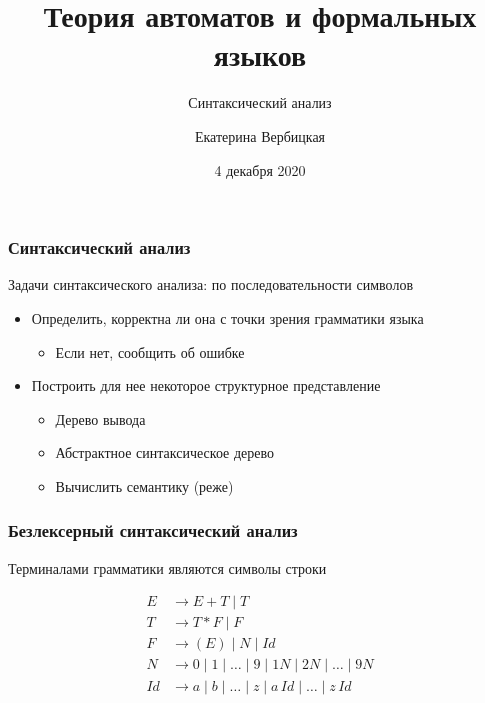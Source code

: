 \documentclass{beamer}
\title[]{Теория автоматов и формальных языков}
\subtitle[]{Синтаксический анализ}
\institute[]{
Санкт-Петербургский государственный электротехнический университет <<ЛЭТИ>>\\
}
\author[]{Екатерина Вербицкая}
\date{4 декабря 2020}
\begin{document}
{
  \begin{frame}
    \titlepage
  \end{frame}
}

\begin{frame}[fragile]
  \frametitle{Синтаксический анализ}
\begin{center}
  Задачи синтаксического анализа: по последовательности символов
\end{center}

  \begin{itemize}
    \item Определить, корректна ли она с точки зрения грамматики языка
    \begin{itemize}
      \item Если нет, сообщить об ошибке
    \end{itemize}
    \item Построить для нее некоторое структурное представление
    \begin{itemize}
      \item Дерево вывода
      \item Абстрактное синтаксическое дерево
      \item Вычислить семантику (реже)
    \end{itemize}
  \end{itemize}
\end{frame}

\begin{frame}[fragile]
  \frametitle{Безлексерный синтаксический анализ}
\begin{center}
  Терминалами грамматики являются символы строки
\end{center}

\begin{align*}
  E &\to E + T \mid T  \\
  T &\to T * F \mid F  \\
  F &\to (E) \mid N \mid Id \\
  N &\to 0 \mid 1 \mid \dots \mid 9 \mid 1N \mid 2N \mid \dots \mid 9N \\
  Id &\to a \mid b \mid \dots \mid z \mid a \, Id \mid \dots \mid z \, Id
\end{align*}
\end{frame}
\end{document}
